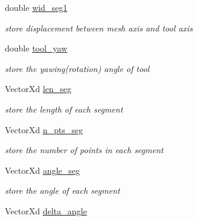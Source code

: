 \begin{DoxyCompactItemize}
\mbox{\label{classCreate__Tool_a9f61a626e0c3b4853e0ba7a6834382d2}} 
double \hyperlink{classCreate__Tool_a9f61a626e0c3b4853e0ba7a6834382d2}{wid\+\_\+seg1}
\begin{DoxyCompactList}\small\item\em store displacement between mesh axis and tool axis \end{DoxyCompactList}\item 
\mbox{\label{classCreate__Tool_a8c086a3533361ff6c1614ce3590183f2}} 
double \hyperlink{classCreate__Tool_a8c086a3533361ff6c1614ce3590183f2}{tool\+\_\+yaw}
\begin{DoxyCompactList}\small\item\em store the yawing(rotation) angle of tool \end{DoxyCompactList}\item 
\mbox{\label{classCreate__Tool_add39151bcacd8dec6f1864484f7815be}} 
Vector\+Xd \hyperlink{classCreate__Tool_add39151bcacd8dec6f1864484f7815be}{len\+\_\+seg}
\begin{DoxyCompactList}\small\item\em store the length of each segment \end{DoxyCompactList}\item 
\mbox{\label{classCreate__Tool_aa76196be75a54a73255131e9ce6b072a}} 
Vector\+Xd \hyperlink{classCreate__Tool_aa76196be75a54a73255131e9ce6b072a}{n\+\_\+pts\+\_\+seg}
\begin{DoxyCompactList}\small\item\em store the number of points in each segment \end{DoxyCompactList}\item 
\mbox{\label{classCreate__Tool_a9e73fe1f442a53c41f917cf8937a4216}} 
Vector\+Xd \hyperlink{classCreate__Tool_a9e73fe1f442a53c41f917cf8937a4216}{angle\+\_\+seg}
\begin{DoxyCompactList}\small\item\em store the angle of each segment \end{DoxyCompactList}\item 
\mbox{\label{classCreate__Tool_ad88f83e484d6945af84f521a2710e4bc}} 
Vector\+Xd \hyperlink{classCreate__Tool_ad88f83e484d6945af84f521a2710e4bc}{delta\+\_\+angle}

\end{DoxyCompactItemize}
